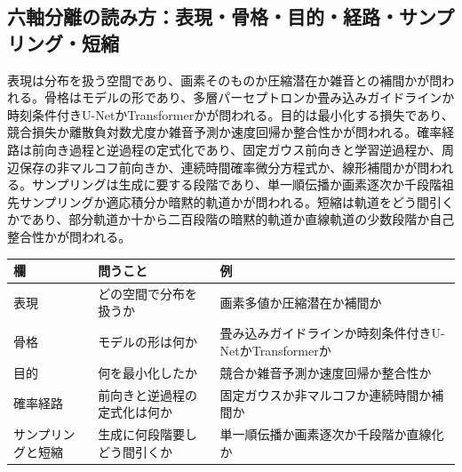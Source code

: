 \documentclass[lualatex,a4paper,10pt]{jlreq}
\begin{document}
\subsection{六軸分離の読み方：表現・骨格・目的・経路・サンプリング・短縮}
表現は分布を扱う空間であり、画素そのものか圧縮潜在か雑音との補間かが問われる\autocite{btd017,btd023,btd026}。骨格はモデルの形であり、多層パーセプトロンか畳み込みガイドラインか時刻条件付きU-NetかTransformerかが問われる\autocite{btd013,btd014,btd019,btd025}。目的は最小化する損失であり、競合損失か離散負対数尤度か雑音予測か速度回帰か整合性かが問われる\autocite{btd013,btd017,btd019,btd027,btd029}。確率経路は前向き過程と逆過程の定式化であり、固定ガウス前向きと学習逆過程か、周辺保存の非マルコフ前向きか、連続時間確率微分方程式か、線形補間かが問われる\autocite{btd019,btd020,btd021,btd028}。サンプリングは生成に要する段階であり、単一順伝播か画素逐次か千段階祖先サンプリングか適応積分か暗黙的軌道かが問われる\autocite{btd013,btd017,btd019,btd021,btd023}。短縮は軌道をどう間引くかであり、部分軌道か十から二百段階の暗黙的軌道か直線軌道の少数段階か自己整合性かが問われる\autocite{btd020,btd023,btd027,btd029}。

\begin{center}
\small
\begin{tabularx}{\textwidth}{@{}p{}p{}X@{}}
\toprule
欄 & 問うこと & 例 \\
\midrule
表現 & どの空間で分布を扱うか & 画素多値か圧縮潜在か補間か \\
骨格 & モデルの形は何か & 畳み込みガイドラインか時刻条件付きU-NetかTransformerか \\
目的 & 何を最小化したか & 競合か雑音予測か速度回帰か整合性か \\
確率経路 & 前向きと逆過程の定式化は何か & 固定ガウスか非マルコフか連続時間か補間か \\
サンプリングと短縮 & 生成に何段階要しどう間引くか & 単一順伝播か画素逐次か千段階か直線化か \\
\bottomrule
\end{tabularx}
\end{center}
\end{document}
